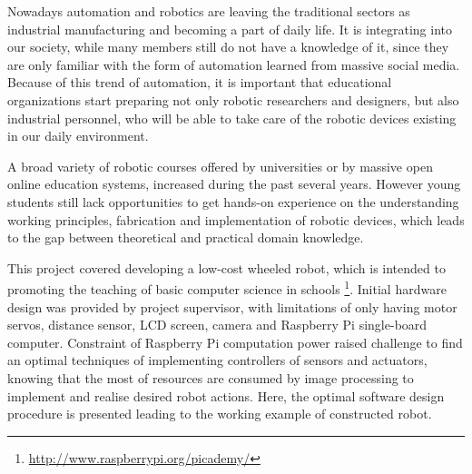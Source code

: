 Nowadays automation and robotics are leaving the traditional sectors as industrial manufacturing and becoming a part of daily life. It is integrating into our society, while many members still do not have a knowledge of it, since they are only familiar with the form of automation learned from massive social media.
Because of this trend of automation, it is important that educational organizations start preparing not only robotic researchers and designers, but also industrial personnel, who will be able
to take care of the robotic devices existing in our daily environment. 

A broad variety of robotic courses offered by universities or by massive open online education systems, increased during the past several years. However young students still lack opportunities to get hands-on experience on the understanding working principles, fabrication and implementation of robotic devices, which leads to the gap between theoretical and practical domain knowledge.

This project covered developing a low-cost wheeled robot, which is intended to promoting the teaching of basic computer science in schools \footnote{\url{http://www.raspberrypi.org/picademy/}}. Initial hardware design was provided by project supervisor, with limitations of only having motor servos, distance sensor, LCD screen, camera and Raspberry Pi single-board computer.
Constraint of  Raspberry Pi computation power raised challenge to find an  optimal techniques of implementing controllers of sensors and actuators, knowing that the most of resources are consumed by image processing to implement and realise desired robot actions. Here, the optimal software design procedure is presented leading to the working example of constructed robot.

